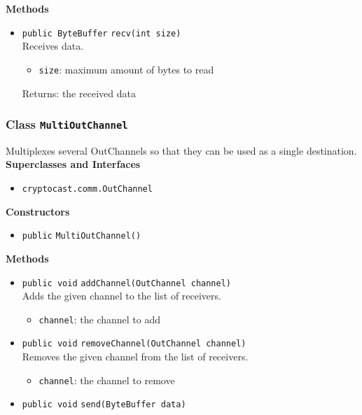 \textbf{Methods}
\begin{itemize}
\item \lstinline|public ByteBuffer| \lstinline|recv|\lstinline|(int size)|\\
Receives data.
\begin{itemize}
\item \lstinline|size|: maximum amount of bytes to read
\end{itemize}

Returns: the received data

\end{itemize}

\subsubsection{Class \lstinline|MultiOutChannel|}
Multiplexes several OutChannels so that they can be used as a single
 destination. \\


\textbf{Superclasses and Interfaces}
\begin{itemize}
\item \lstinline|cryptocast.comm.OutChannel|
\end{itemize}



\textbf{Constructors}
\begin{itemize}
\item \lstinline|public| \lstinline|MultiOutChannel|\lstinline|()|




\end{itemize}


\textbf{Methods}
\begin{itemize}
\item \lstinline|public void| \lstinline|addChannel|\lstinline|(OutChannel channel)|\\
Adds the given channel to the list of receivers.
\begin{itemize}
\item \lstinline|channel|: the channel to add
\end{itemize}



\item \lstinline|public void| \lstinline|removeChannel|\lstinline|(OutChannel channel)|\\
Removes the given channel from the list of receivers.
\begin{itemize}
\item \lstinline|channel|: the channel to remove
\end{itemize}



\item \lstinline|public void| \lstinline|send|\lstinline|(ByteBuffer data)|




\end{itemize}

